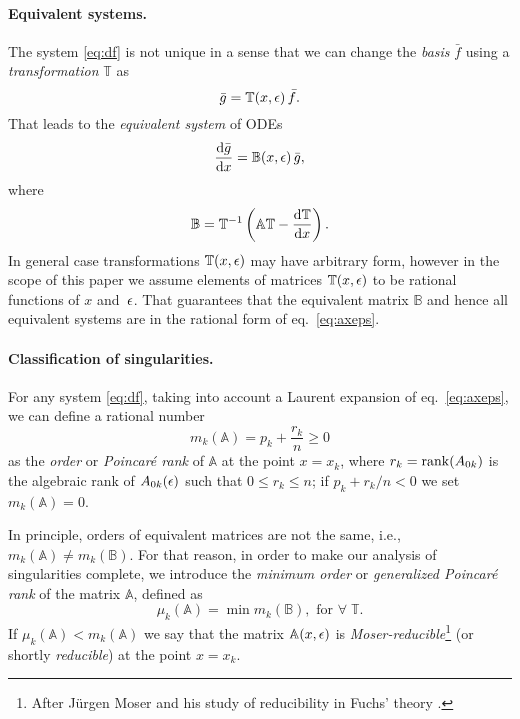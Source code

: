\documentclass[12pt,a4paper]{article}
\def\M#1{\mathbb{#1}} %
\begin{document}
\paragraph{Equivalent systems.}
The system \eqref{eq:df} is not unique in a sense that we can change the {\em basis} $\bar{f}$ using a {\em transformation} $\M T$ as
\begin{equation}
\label{eq:gtf}
  \bar{g} = \M T(x,\eps)\, \bar{f}.
\end{equation}
That leads to the {\em equivalent system} of ODEs
\begin{equation}
  \frac{\D \bar{g}}{\D x} = \M B(x,\eps)\,\bar{g},
\end{equation}
where
\begin{equation}
\label{eq:bta}
  \M B = \M T^{-1} \left( \M A \M T - \frac{\D \M T}{\D x} \right).
\end{equation}
In general case transformations $\M T(x,\eps)$ may have arbitrary form, however in the scope of this paper we assume elements of matrices $\M T(x,\eps)$ to be rational functions of $x$ and~$\epsilon$.
That guarantees that the equivalent matrix $\M B$ and hence all equivalent systems are in the rational form of eq.~\eqref{eq:axeps}.

\paragraph{Classification of singularities.}
For any system \eqref{eq:df}, taking into account a Laurent expansion of eq.~\eqref{eq:axeps}, we can define a rational number
\begin{equation}
\label{eq:mk}
  m_k(\M A) = p_k + \frac{r_k}{n} \ge 0
\end{equation}
as the {\em order} or {\em Poincar\'e rank} of $\M A$ at the point $x=x_k$, where $r_k = \mathrm{rank}(A_{0k})$ is the algebraic rank of $A_{0k}(\epsilon)$ such that $0 \le r_k \le n$; if $p_k + r_k/n < 0$ we set $m_k(\M A) = 0$.

In principle, orders of equivalent matrices are not the same, i.e., $m_k(\M A) \ne m_k(\M B)$.
For that reason, in order to make our analysis of singularities complete, we introduce the {\em minimum order} or {\em generalized Poincar\'e rank} of the matrix $\M A$, defined as
\begin{equation}
\label{eq:muk}
  \mu_k(\M A) = \min m_k(\M B), \text{ for } \forall \; \M T.
\end{equation}
If $\mu_k(\M A) < m_k(\M A)$ we say that the matrix $\M A(x,\eps)$ is {\em Moser-reducible}\footnote{After J\"urgen Moser and his study of reducibility in Fuchs' theory \cite{Mos59}.} (or shortly {\em reducible}) at the point $x=x_k$.
\end{document}
